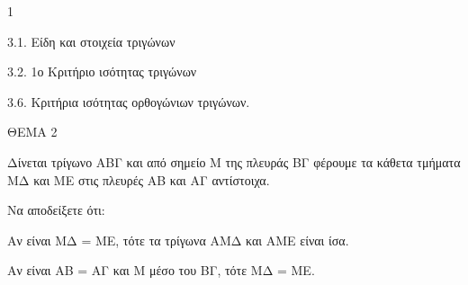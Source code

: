 \begin{ylh}{1}
    \item 3.1. Είδη και στοιχεία τριγώνων
    \item 3.2. 1ο Κριτήριο ισότητας τριγώνων
    \item 3.6. Κριτήρια ισότητας ορθογώνιων τριγώνων.
\end{ylh}

ΘΕΜΑ 2

Δίνεται τρίγωνο ΑΒΓ και από σημείο Μ της πλευράς ΒΓ φέρουμε τα κάθετα τμήματα ΜΔ και ΜΕ στις πλευρές ΑΒ και ΑΓ αντίστοιχα.

Να αποδείξετε ότι:

\begin{alist}
\item Αν είναι ΜΔ = ΜΕ, τότε τα τρίγωνα ΑΜΔ και ΑΜΕ είναι ίσα. 

\item Αν είναι ΑΒ = ΑΓ και Μ μέσο του ΒΓ, τότε ΜΔ = ΜΕ. 


\begin{center}
\end{center}
\end{alist}
